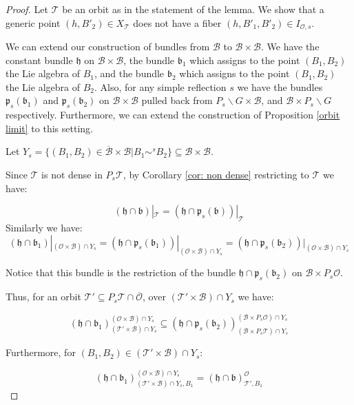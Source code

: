 \documentclass[12pt]{article}
\newcommand{\B}{\mathcal{B}}
\newcommand{\s}{\mathcal{O}}
\theoremstyle{plain}
\theoremstyle{definition}
\begin{document}
\begin{proof}

    Let $\mathcal{T}$ be an orbit as in the statement of the lemma. We show that a generic point $(h,B'_{2})\in X_{\mathcal{T}}$ does not have a fiber $(h,B'_{1},B'_{2})\in I_{\s,s}$.
    
    We can extend our construction of bundles from $\B$ to $\B\times \B$. We have the constant bundle $\mathfrak{h}$ on $\B\times \B$, the bundle $\mathfrak{b_1}$ which assigns to the point $(B_1,B_2)$ the Lie algebra of $B_1$, and the bundle $\mathfrak{b_2}$ which assigns to the point $(B_1,B_2)$ the Lie algebra of $B_2$. Also, for any simple reflection $s$ we have the bundles $\mathfrak{p}_s(\mathfrak{b}_1)$ and $\mathfrak{p}_s(\mathfrak{b}_2)$ on $\B\times \B$ pulled back from $P_s\backslash G\times \B$, and $\B\times P_s\backslash G$ respectively. Furthermore, we can extend the construction of Proposition \ref{orbit limit} to this setting. 

    Let $Y_{s}=\overline{\{(B_1,B_2)\in \B\times\B|B_1\sim^sB_2\}} \subseteq \B\times \B$.
    
    Since $\mathcal{T}$ is not dense in $P_{s} \mathcal{T}$, by Corollary \ref{cor: non dense} restricting to $\mathcal{T}$ we have:

    $$ (\mathfrak{h}\cap \mathfrak{b})|_{ \mathcal{T}}=(\mathfrak{h}\cap \mathfrak{p}_{s}(\mathfrak{b}))|_{\mathcal{T}}$$
    Similarly we have:
    $$ (\mathfrak{h}\cap \mathfrak{b_{1}})|_{(\mathcal{O}\times \B) \cap Y_s}=(\mathfrak{h}\cap \mathfrak{p}_{s}(\mathfrak{b_{1}}))|_{(\mathcal{O}\times \B) \cap Y_s} = (\mathfrak{h}\cap \mathfrak{p}_{s}(\mathfrak{b_{2}}))|_{(\mathcal{O}\times \B) \cap Y_s} $$

    Notice that this bundle is the restriction of the bundle $\mathfrak{h}\cap \mathfrak{p}_{s}(\mathfrak{b_{2}})$ on $\B \times P_s \mathcal{O} $.

    Thus, for an orbit $\mathcal{T}' \subseteq P_{s}\mathcal{T} \cap \overline{\mathcal{O}}$, over $(\mathcal{T}'\times\B)\cap Y_s$ we have:

    $$ (\mathfrak{h} \cap \mathfrak{b_{1}})^{(\mathcal{O}\times \B) \cap Y_{s}}_{(\mathcal{T}'\times \B) \cap Y_{s}} \subseteq (\mathfrak{h}\cap\mathfrak{p}_{s}(\mathfrak{b_{2}}))^{(\B \times P_{s} \mathcal{O})\cap Y_{s}}_{(\B \times P_{s}\mathcal{T})\cap Y_{s}}$$

    Furthermore, for $(B_{1},B_{2})\in (\mathcal{T}' \times \B) \cap Y_{s}$:

    $$(\mathfrak{h} \cap \mathfrak{b_{1}})^{(\mathcal{O}\times \B) \cap Y_{s}}_{(\mathcal{T}'\times \B) \cap Y_{s},B_{1}} = (\mathfrak{h} \cap \mathfrak{b})^{\mathcal{O}}_{\mathcal{T}',B_{1}}$$


\end{proof}
\end{document}
